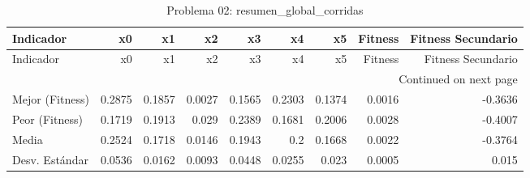 \begin{longtable}{lrrrrrrrr}
\caption{Problema 02: resumen\_global\_corridas}\label{tab:resumen_global_corridas} \\
\toprule
Indicador & x0 & x1 & x2 & x3 & x4 & x5 & Fitness & Fitness Secundario \\
\midrule
\endfirsthead
\toprule
Indicador & x0 & x1 & x2 & x3 & x4 & x5 & Fitness & Fitness Secundario \\
\midrule
\endhead
\midrule
\multicolumn{9}{r}{Continued on next page} \\
\midrule
\endfoot
\bottomrule
\endlastfoot
Mejor (Fitness) & 0.2875 & 0.1857 & 0.0027 & 0.1565 & 0.2303 & 0.1374 & 0.0016 & -0.3636 \\
Peor (Fitness) & 0.1719 & 0.1913 & 0.029 & 0.2389 & 0.1681 & 0.2006 & 0.0028 & -0.4007 \\
Media & 0.2524 & 0.1718 & 0.0146 & 0.1943 & 0.2 & 0.1668 & 0.0022 & -0.3764 \\
Desv. Estándar & 0.0536 & 0.0162 & 0.0093 & 0.0448 & 0.0255 & 0.023 & 0.0005 & 0.015 \\
\end{longtable}